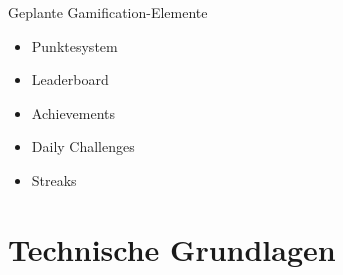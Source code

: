 \documentclass[xcolor=dvipsnames]{beamer}
\begin{document}
\begin{frame}{Geplante Gamification-Elemente}
    \begin{itemize}
        \item Punktesystem
        \item Leaderboard
        \item Achievements
        \item Daily Challenges
        \item Streaks
    \end{itemize}
\end{frame}
\section{Technische Grundlagen}
\subsection{}
\end{document}
